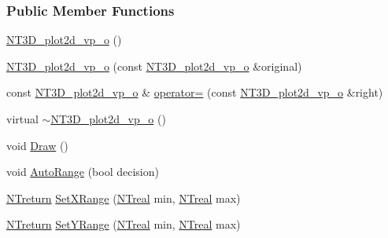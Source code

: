\subsubsection*{Public Member Functions}
\begin{DoxyCompactItemize}
\item 
\hyperlink{class_n_t3_d__plot2d__vp__o_a836f3af174172122caa808765d3d1590}{NT3D\_\-plot2d\_\-vp\_\-o} ()
\item 
\hyperlink{class_n_t3_d__plot2d__vp__o_a5586d2635e58e726d8e057d9ee3f3e5a}{NT3D\_\-plot2d\_\-vp\_\-o} (const \hyperlink{class_n_t3_d__plot2d__vp__o}{NT3D\_\-plot2d\_\-vp\_\-o} \&original)
\item 
const \hyperlink{class_n_t3_d__plot2d__vp__o}{NT3D\_\-plot2d\_\-vp\_\-o} \& \hyperlink{class_n_t3_d__plot2d__vp__o_a8079e32017eb61d9d3adef3e391e8015}{operator=} (const \hyperlink{class_n_t3_d__plot2d__vp__o}{NT3D\_\-plot2d\_\-vp\_\-o} \&right)
\item 
virtual \hyperlink{class_n_t3_d__plot2d__vp__o_a5d532cfe41e851806f33c2460e97b41a}{$\sim$NT3D\_\-plot2d\_\-vp\_\-o} ()
\item 
void \hyperlink{class_n_t3_d__plot2d__vp__o_a468dc219455b1f6d301f75c86c828075}{Draw} ()
\item 
void \hyperlink{class_n_t3_d__plot2d__vp__o_a4c8b7c6b22b16f326291eb68abb49293}{AutoRange} (bool decision)
\item 
\hyperlink{nt__types_8h_ab9564ee8f091e809d21b8451c6683c53}{NTreturn} \hyperlink{class_n_t3_d__plot2d__vp__o_ae6f0289d8be79f141b84ec8cd26901cf}{SetXRange} (\hyperlink{nt__types_8h_a814a97893e9deb1eedcc7604529ba80d}{NTreal} min, \hyperlink{nt__types_8h_a814a97893e9deb1eedcc7604529ba80d}{NTreal} max)
\item 
\hyperlink{nt__types_8h_ab9564ee8f091e809d21b8451c6683c53}{NTreturn} \hyperlink{class_n_t3_d__plot2d__vp__o_a815d114051b0bb58d2eef139512ec328}{SetYRange} (\hyperlink{nt__types_8h_a814a97893e9deb1eedcc7604529ba80d}{NTreal} min, \hyperlink{nt__types_8h_a814a97893e9deb1eedcc7604529ba80d}{NTreal} max)
\end{DoxyCompactItemize}
